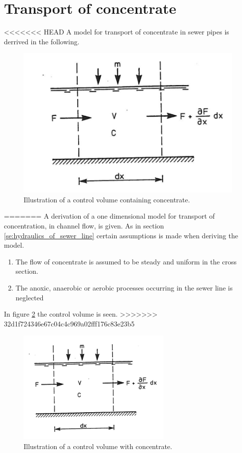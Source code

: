 \section{Transport of concentrate}\label{se:transport_of_concentrate}

<<<<<<< HEAD
A model for transport of concentrate in sewer pipes is derrived in the following.

\begin{figure}[H]
\centering
\includegraphics[width=.6\textwidth]{report/modeling/pictures/poopvolume.png}
\caption{Illustration of a control volume containing concentrate.}
\label{fig:poopvolume}
\end{figure} 
=======
 A derivation of a one dimensional model for transport of concentration, in channel flow, is given. 
 As in section \ref{se:hydraulics_of_sewer_line} certain assumptions is made when deriving the model.

 \begin{table}[H]
\begin{enumerate}
	\item The flow of concentrate is assumed to be steady and uniform in the cross section.
	\item The anoxic, anaerobic or aerobic processes occurring in the sewer line is neglected   
\end{enumerate}
\label{tab:concentrate_flow}
\end{table}
 In figure \ref{fig:concentrate_volume} the control volume is seen. 
>>>>>>> 32d1f724346e67c04c4c969a02fff176c83e23b5

 \begin{figure}[H]
\centering
\includegraphics[width=.6\textwidth]{report/modeling/pictures/concentrate_volume.png}
\caption{Illustration of a control volume with concentrate.}
\label{fig:concentrate_volume}
\end{figure} 

